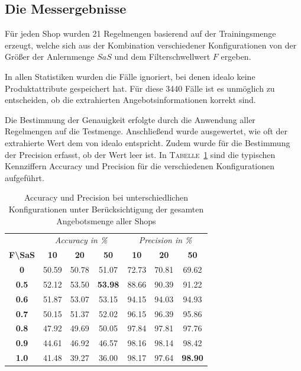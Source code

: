 \subsection{Die Messergebnisse}
\label{subsec:genauigkeitsmessung}

Für jeden Shop wurden 21 Regelmengen basierend auf der Trainingsmenge erzeugt, welche sich aus der Kombination
verschiedener Konfigurationen von der Größer der Anlernmenge $SaS$ und dem Filterschwellwert $F$ ergeben.

In allen Statistiken wurden die Fälle ignoriert, bei denen idealo keine Produktattribute gespeichert hat.
Für diese 3440 Fälle ist es unmöglich zu entscheiden, ob die extrahierten Angebotsinformationen korrekt sind.

Die Bestimmung der Genauigkeit erfolgte durch die Anwendung aller Regelmengen auf die Testmenge.
Anschließend wurde ausgewertet, wie oft der extrahierte Wert dem von idealo entspricht.
Zudem wurde für die Bestimmung der Precision erfasst, ob der Wert leer ist.
In \textsc{Tabelle}~\ref{tab:accuracy-precision} sind die typischen Kennziffern Accuracy und Precision für die
verschiedenen Konfigurationen aufgeführt.

\begin{table}[H]
    \centering
    \begin{tabular}{ c | c c c | c c c }
        &   \multicolumn{3}{c}{\textit{Accuracy in \%}}    &   \multicolumn{3}{c}{\textit{Precision in \%}} \\
        \textbf{F\textbackslash SaS} & \textbf{10} & \textbf{20} & \textbf{50} & \textbf{10} & \textbf{20} & \textbf{50}  \\
        \hline
        \textbf{0}       &   50.59 &   50.78 &   51.07         &   72.73 &   70.81 &   69.62 \\
        \textbf{0.5}     &   52.12 &   53.50 &   \textbf{53.98}&   88.66 &   90.39 &   91.22 \\
        \textbf{0.6}     &   51.87 &   53.07 &   53.15         &   94.15 &   94.03 &   94.93 \\
        \textbf{0.7}     &   50.15 &   51.37 &   52.02         &   96.15 &   96.39 &   95.86 \\
        \textbf{0.8}     &   47.92 &   49.69 &   50.05         &   97.84 &   97.81 &   97.76 \\
        \textbf{0.9}     &   44.61 &   46.92 &   46.57         &   98.16 &   98.14 &   98.42 \\
        \textbf{1.0}     &   41.48 &   39.27 &   36.00         &   98.17 &   97.64 &   \textbf{98.90}

    \end{tabular}
    \caption{Accuracy und Precision bei unterschiedlichen Konfigurationen unter Berücksichtigung der gesamten
    Angebotsmenge aller Shops}
    \label{tab:accuracy-precision}
\end{table}

